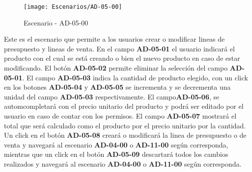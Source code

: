\begin{figure}[H]
\centering
\texttt{[image: Escenarios/AD-05-00]}
\caption{Escenario - AD-05-00}
\label{fig:AD-05-00}
\end{figure}
Este es el escenario que permite a los usuarios crear o modificar lineas de presupuesto y lineas de venta. En el campo \textbf{AD-05-01} el usuario indicará el producto con el cual se está creando o bien el nuevo producto en caso de estar modificando. El botón \textbf{AD-05-02} permite eliminar la selección del campo \textbf{AD-05-01}. El campo \textbf{AD-05-03} indica la cantidad de producto elegido, con un click en los botones \textbf{AD-05-04} y \textbf{AD-05-05} se incrementa y se decrementa una unidad del campo \textbf{AD-05-03} respectivamente. El campo\textbf{AD-05-06}, se automcompletará con el precio unitario del producto y podrá ser editado por el usuario en caso de contar con los permisos. El campo \textbf{AD-05-07} mostrará el total que será calculado como el producto por el precio unitario por la cantidad.
Un click en el botón \textbf{AD-05-08} creará o modificará la linea de presupuesto o de venta y navegará al escenario \textbf{AD-04-00} o \textbf{AD-11-00} según corresponda, mientras que un click en el botón \textbf{AD-05-09} descartará todos los cambios realizados y navegará al escenario \textbf{AD-04-00} o \textbf{AD-11-00} según corresponda.
\clearpage
